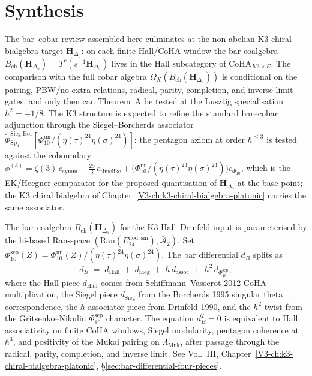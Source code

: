 \section{Synthesis}
\label{sec:bar-cobar-review-supplement}

\begin{remark}
\label{rem:bar-cobar-review-1}
The bar--cobar review assembled here culminates at the non-abelian K3
chiral bialgebra target $\mathbf H_{\Delta_5}$: on each finite
Hall/CoHA window the bar coalgebra
$B_{\mathrm{ch}}(\mathbf H_{\Delta_5}) = T^c(s^{-1}\bar{\mathbf H}_{\Delta_5})$
lives in the Hall subcategory of $\mathrm{CoHA}_{K3\times E}$. The
comparison with the full cobar algebra
$\Omega_X(B_{\mathrm{ch}}(\mathbf H_{\Delta_5}))$ is conditional on the
pairing, PBW/no-extra-relations, radical, parity, completion, and
inverse-limit gates, and only then can Theorem~A be tested at the
Lusztig specialisation $\hbar^2 = -1/8$. The K3 structure is expected
to refine the standard bar--cobar adjunction through the
Siegel--Borcherds associator
\(\widetilde{\Phi}^{\mathrm{Sieg\text{-}Bor}}_{\mathrm{Sp}_4}
[\Phi_{10}^{\mathrm{un}}/(\eta(\tau)^{24}\eta(\sigma)^{24})]\):
the pentagon axiom at order $\hbar^{\le 3}$ is tested against the
coboundary
\(\phi^{(3)} = \zeta(3)\, c_{\mathrm{symm}} + \tfrac{25}{3}\, c_{\mathrm{timelike}}
+ \bigl(\Phi_{10}^{\mathrm{un}}/(\eta(\tau)^{24}\eta(\sigma)^{24})\bigr)c_{\Phi_{10}}\),
which is the EK/Heegner comparator for the proposed quantisation of
$\mathbf H_{\Delta_5}$ at the base point; the K3 chiral bialgebra of
Chapter~\ref{V3-ch:k3-chiral-bialgebra-platonic} carries the same
associator.
\end{remark}

\begin{remark}
\label{rem:bar-cobar-review-2}
The bar coalgebra $B_{\mathrm{ch}}(\mathbf H_{\Delta_5})$ for the
K3 Hall--Drinfeld input is parameterised by the bi-based Ran-space
$(\mathrm{Ran}(E^{\mathrm{nod,sm}}_{24}), \bar{\mathcal A}_2)$. Set
\(\Phi_{10}^{\mathrm{sep}}(Z)=
\Phi_{10}^{\mathrm{un}}(Z)/(\eta(\tau)^{24}\eta(\sigma)^{24})\).
The bar differential $d_B$ splits as
\[
d_B \;=\; d_{\mathrm{Hall}} \;+\; d_{\mathrm{Sieg}} \;+\; \hbar\, d_{\mathrm{assoc}} \;+\; \hbar^2\, d_{\Phi_{10}^{\mathrm{sep}}},
\]
where the Hall piece $d_{\mathrm{Hall}}$ comes from Schiffmann--Vasserot
2012 CoHA multiplication, the Siegel piece $d_{\mathrm{Sieg}}$ from the
Borcherds 1995 singular theta correspondence, the $\hbar$-associator
piece from Drinfeld 1990, and the $\hbar^2$-twist from the
Gritsenko--Nikulin \(\Phi_{10}^{\mathrm{sep}}\) character. The equation
$d_B^2 = 0$ is equivalent to Hall associativity on finite CoHA
windows, Siegel modularity, pentagon coherence at $\hbar^3$, and
positivity of the Mukai pairing on $\Lambda_{\mathrm{Muk}}$, after
passage through the radical, parity, completion, and inverse limit. See
Vol.~III, Chapter~\ref{V3-ch:k3-chiral-bialgebra-platonic},
\S\ref{sec:bar-differential-four-pieces}.
\end{remark}
